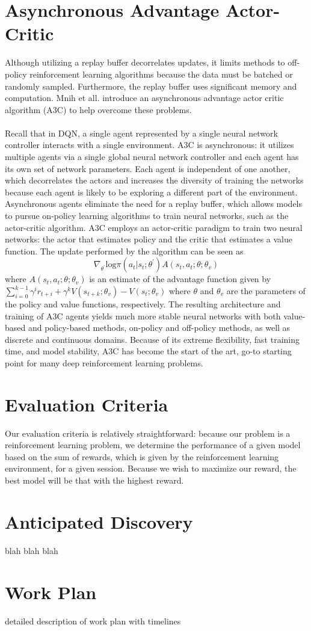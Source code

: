 \documentclass[journal,onecolumn]{IEEEtran}
\begin{document}
\section{Asynchronous Advantage Actor-Critic}
Although utilizing a replay buffer decorrelates updates, it limits methods to off-policy reinforcement learning algorithms because the data must be batched or randomly sampled. Furthermore, the replay buffer uses significant memory and computation. Mnih et all. introduce an asynchronous advantage actor critic algorithm (A3C) to help overcome these problems. \\\\
Recall that in DQN, a single agent represented by a single neural network controller interacts with a single environment. A3C is asynchronous: it utilizes multiple agents via a single global neural network controller and each agent has its own set of network parameters. Each agent is independent of one another, which decorrelates the actors and increases the diversity of training the networks because each agent is likely to be exploring a different part of the environment. Asynchronous agents eliminate the need for a replay buffer, which allows models to pursue on-policy learning algorithms to train neural networks, such as the actor-critic algorithm. A3C employs an actor-critic paradigm to train two neural networks: the actor that estimates policy and the critic that estimates a value function. The update performed by the algorithm can be seen as
\[
\nabla_{\theta^{'}}\text{log}\pi(a_{t}|s_{t};\theta^{'})A(s_{t},a_{t};\theta;\theta_{v})
\]
where $A(s_{t},a_{t};\theta;\theta_{v})$ is an estimate of the advantage function given by $\sum_{i=0}^{k-1}\gamma^{i}r_{t+i}+\gamma^{k}V(s_{t+k};\theta_{v}) - V(s_{t};\theta_{v})$ where $\theta$ and $\theta_{v}$ are the parameters of the policy and value functions, respectively. The resulting architecture and training of A3C agents yields much more stable neural networks with both value-based and policy-based methods, on-policy and off-policy methods, as well as discrete and continuous domains. Because of its extreme flexibility, fast training time, and model stability, A3C has become the start of the art, go-to starting point for many deep reinforcement learning problems. 
\section{Evaluation Criteria}
Our evaluation criteria is relatively straightforward: because our problem is a reinforcement learning problem, we determine the performance of a given model based on the sum of rewards, which is given by the reinforcement learning environment, for a given session. Because we wish to maximize our reward, the best model will be that with the highest reward. 
\section{Anticipated Discovery}
blah blah blah
\section{Work Plan}
detailed description of work plan with timelines


\cite{DBLP:journals/corr/LillicrapHPHETS15}
\cite{DBLP:journals/corr/MnihKSGAWR13}
\cite{DBLP:journals/corr/WangFL15}
\end{document}
